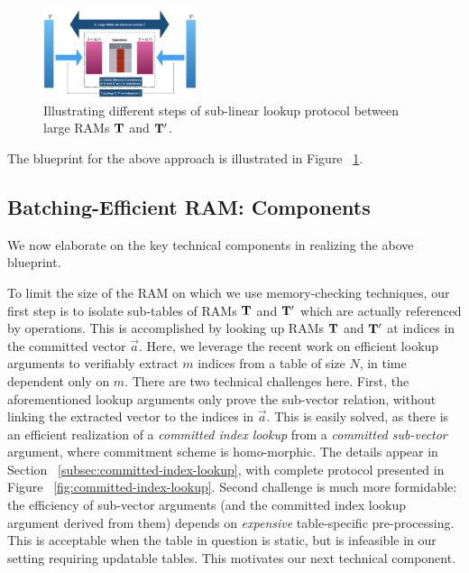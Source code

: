 \begin{figure}[htbp]
    \centering
    \includegraphics[width=0.4\textwidth]{RAM-Lookup}
    \caption{Illustrating different steps of sub-linear lookup protocol between large RAMs $\mathbf{T}$ and $\mathbf{T}'$.}
    \label{fig:blueprint}
\end{figure}

The blueprint for the above approach is illustrated in Figure ~\ref{fig:blueprint}.

\subsection{Batching-Efficient RAM: Components}\label{subsec:batching-efficient-ram-components}
We now elaborate on the key technical components in realizing the above blueprint.

\smallskip

 To limit the size of the RAM on which we use memory-checking techniques,
our first step is to isolate sub-tables of RAMs $\mathbf{T}$ and
$\mathbf{T}'$ which are actually referenced by operations. This is accomplished by looking up RAMs $\mathbf{T}$ and
$\mathbf{T}'$ at indices in the committed vector $\vec{a}$. Here, we leverage the recent work on efficient lookup
arguments to verifiably extract $m$ indices from a table of size $N$, in time dependent only on $m$.
There are two technical challenges here. First, the aforementioned lookup arguments only prove the sub-vector
relation, without linking the extracted vector to the indices in $\vec{a}$. This is easily solved, as there
is an efficient realization of a {\em committed index lookup} from a {\em committed sub-vector} argument,
where commitment scheme is homo-morphic. The details appear in Section ~\ref{subsec:committed-index-lookup},
with complete protocol presented in Figure ~\ref{fig:committed-index-lookup}. Second challenge is much more
formidable: the efficiency of sub-vector arguments (and the committed index lookup argument derived from them)
depends on {\em expensive} table-specific pre-processing. This is acceptable when the table in question is
static, but is infeasible in our setting requiring updatable tables. This motivates our next technical
component.

